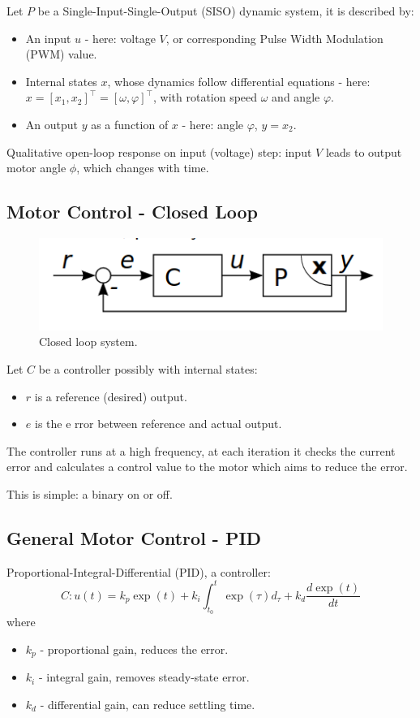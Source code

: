\documentclass[11pt]{article}
\begin{document}
Let $P$ be a Single-Input-Single-Output (SISO) dynamic system, it is described by:
\begin{itemize}
  \item An input $u$ - here: voltage $V$, or corresponding Pulse Width Modulation (PWM) value.
  \item Internal states $x$, whose dynamics follow differential equations - here: $x = [x_1, x_2]^\top = [\omega, \varphi]^\top$, with rotation speed $\omega$ and angle $\varphi$.
  \item An output $y$ as a function of $x$ - here: angle $\varphi$, $y = x_2$.
\end{itemize}

Qualitative open-loop response on input (voltage) step: input $V$ leads to output motor angle $\phi$, which changes with time.

\subsection{Motor Control - Closed Loop}
\begin{figure}[h]
  \caption{Closed loop system.}
  \includegraphics[scale=0.4]{closedloop}
  \centering
\end{figure}

Let $C$ be a controller possibly with internal states:
\begin{itemize}
  \item $r$ is a reference (desired) output.
  \item $e$ is the e  rror between reference and actual output.
\end{itemize}

The controller runs at a high frequency, at each iteration it checks the current error and calculates a control value to the motor which aims to reduce the error.

This is simple: a binary on or off.

\subsection{General Motor Control - PID}
Proportional-Integral-Differential (PID), a controller:
\[
  C : u(t) = k_p \exp(t) + k_i \int_{t_0}^{t} \exp(\tau)d_\tau + k_d \frac{d\exp(t)}{dt}
\]
where
\begin{itemize}
  \item $k_p$ - proportional gain, reduces the error.
  \item $k_i$ - integral gain, removes steady-state error.
  \item $k_d$ - differential gain, can reduce settling time.
\end{itemize}
\end{document}
